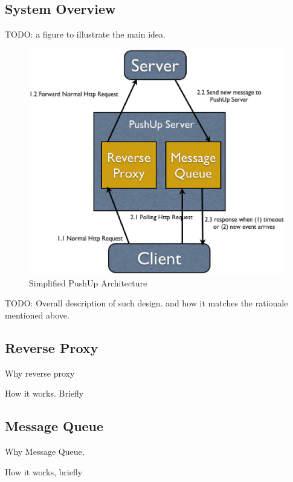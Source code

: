 \subsection{System Overview\\}

TODO: a figure to illustrate the main idea.

\begin{figure}[htb!]
\centering%
    \includegraphics[scale=0.40]{figures/simple_pushup_arch.eps}
    \caption{Simplified PushUp Architecture}
    \label{fig:eventloop}
\end{figure}

TODO: Overall description of such design. and how it matches the rationale mentioned above.


\subsection{Reverse Proxy\\}

Why reverse proxy

How it works. Briefly

\subsection{Message Queue\\}

Why Message Queue, 

How it works, briefly


